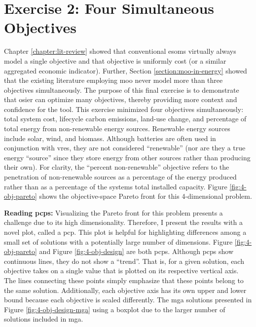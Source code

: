 \section{Exercise 2: Four Simultaneous Objectives}
Chapter \ref{chapter:lit-review} showed that conventional \acp{esom} virtually
always model a single objective and that objective is uniformly cost (or a
similar aggregated economic indicator). Further, Section
\ref{section:moo-in-energy} showed that the existing literature employing
\ac{moo} never model more than three objectives simultaneously. The purpose of
this final exercise is to demonstrate that \ac{osier} can optimize many
objectives, thereby providing more context and confidence for the tool. This
exercise minimized four objectives simultaneously: total system cost, lifecycle
carbon emissions, land-use change, and percentage of total energy from
non-renewable energy sources. Renewable energy sources include solar, wind, and
biomass. Although batteries are often used in conjunction with \acp{vre}, they
are not considered ``renewable'' (nor are they a true energy ``source'' since
they store energy from other sources rather than producing their own). For
clarity, the ``percent non-renewable'' objective refers to the penetration of
non-renewable sources as a percentage of the energy produced rather than as a
percentage of the systems total installed capacity. Figure
\ref{fig:4-obj-pareto} shows the objective-space Pareto front for this
4-dimensional problem.

\begin{noteBox}
\textbf{Reading \Aclp{pcp}:} Visualizing the Pareto front for this problem
presents a challenge due to its high dimensionality. Therefore, I present the
results with a novel plot, called a \ac{pcp}. This plot is helpful for
highlighting differences among a small set of solutions with a potentially large
number of dimensions. Figure \ref{fig:4-obj-pareto} and Figure
\ref{fig:4-obj-design} are both \acp{pcp}. Although \acp{pcp} show continuous
lines, they do not show a ``trend''. That is, for a given solution, each
objective takes on a single value that is plotted on its respective vertical
axis. The lines connecting these points simply emphasize that these points
belong to the same solution. Additionally, each objective axis has its own upper
and lower bound because each objective is scaled differently. The \ac{mga}
solutions presented in Figure \ref{fig:4-obj-design-mga} using a boxplot due to
the larger number of solutions included in \ac{mga}. 
\end{noteBox}


